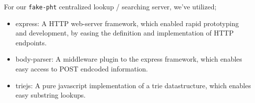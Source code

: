 For our \verb|fake-pht| centralized lookup / searching server, we've utilized;
\begin{itemize}
\item express: A \acs{HTTP} web-server framework, which enabled rapid prototyping and
        development, by easing the definition and implementation of \acs{HTTP} endpoints.
\item body-parser: A middleware plugin to the express framework, which enables 
        easy access to POST endcoded information.
\item triejs: A pure javascript implementation of a trie datastructure, which 
        enables easy substring lookups.
\end{itemize}

